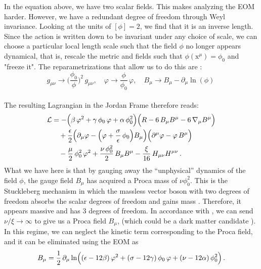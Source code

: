 \documentclass[aps,prd,reprint,preprintnumbers,showpacs,floatfix,nofootinbib,superscript address]{revtex4-2}
\begin{document}
In the equation above, we have two scalar fields. This makes analyzing the EOM harder. However, we have a redundant degree of freedom through Weyl invariance. Looking at the units of $[\phi] = 2$, we find that it is an inverse length. Since the action is written down to be invariant under any choice of scale, we can choose a particular local length scale such that the field $\phi$ no longer appears dynamical, that is, rescale the metric and fields such that $\phi(\text{x}^\mu) = \phi_0$ and "freeze it". The reparametrizations that allow us to do this are :
\[
    g_{\mu \nu}\rightarrow \bigg(\frac{\phi_0}{\phi}\bigg)^2\,g_{\mu \nu},\quad 
    \varphi\rightarrow\frac{\phi}{\phi_0}\,\varphi,\quad 
    B_{\mu}\rightarrow B_{\mu} - \partial_{\mu}\ln(\phi)\ \nonumber
\]
\\
The resulting Lagrangian in the Jordan Frame therefore reads:
\begin{equation}\label{29}
\begin{aligned}
\mathcal{L} &= -\Bigl(\beta\, \varphi^2 + \gamma\, \phi_0\, \varphi + \alpha\, \phi_0^2\Bigr)
\Bigl(R - 6\, B_{\mu} B^{\mu} - 6\, \nabla_{\mu} B^\mu\Bigr) \\
&\quad + \frac{\epsilon}{2} \Bigl(\partial_{\mu}\varphi - \Bigl(\varphi + \frac{\sigma}{\epsilon}\,\phi_0\Bigr)B_{\mu}\Bigr)
\Bigl(\partial^{\mu}\varphi - \varphi\,B^{\mu}\Bigr) \\
&\quad - \frac{\mu}{2}\, \phi_0^2\,\varphi^2 
+ \frac{\nu\,\phi_0^2}{2}\,B_{\mu} B^{\mu} 
- \frac{\xi}{16}\,H_{\mu\nu} H^{\mu\nu}\,.
\end{aligned}
\end{equation}
What we have here is that by gauging away the ``unphysical'' dynamics of the field $\phi$, the gauge field $B_\mu$ has acquired a Proca mass of $\nu \phi_0^2$. This is the Stuckleberg mechanism in which the massless vector boson with two degrees of freedom absorbs the scalar degrees of freedom and gains mass \cite{stueckelberg_wechselwirkungskrafte_1938, kors_aspects_2005}. Therefore, it appears massive and has 3 degrees of freedom. In accordance with \cite{barker2024poincaregaugetheoryconformal}, we can send $\nu/\xi \rightarrow \infty$ to give us a Proca field $B_\mu$, (which could be a dark matter candidate \cite{Lasenby_2016}). In this regime, we can neglect the kinetic term corresponding to the Proca field, and it can be eliminated using the EOM as
\begin{equation}\label{30}
B_\mu = \frac{1}{2}\,\partial_\mu \ln\Bigl((\epsilon-12\beta)\,\varphi^2 + (\sigma-12\gamma)\,\phi_0\,\varphi + (\nu-12\alpha)\,\phi_0^2\Bigr)\,.
\end{equation}
\end{document}
